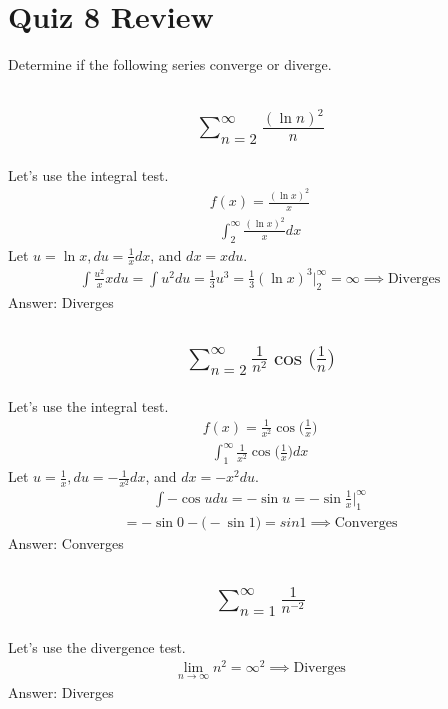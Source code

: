 \documentclass{article}
\begin{document}
\newpage
\section{Quiz 8 Review}
Determine if the following series converge or diverge.
\subsection{
	\begin{align*}
		\sum_{n = 2}^{\infty} \frac{(\ln{n})^2}{n}
	\end{align*}
}
Let's use the integral test.
\begin{align*}
	f(x) = \frac{(\ln{x})^2}{x}
\end{align*}
\begin{align*}
	\int_2^{\infty} {\frac{(\ln{x})^2}{x}} dx
\end{align*}
Let $u = \ln{x}, du = \frac{1}{x}dx$, and $dx = xdu$.
\begin{align*}
	\int {\frac{u^2}{x}x}du = \int{u^2}du = \frac{1}{3}u^3 = \frac{1}{3} (\ln{x})^3 \bigg|_2^{\infty} = \infty \implies \text{Diverges}
\end{align*}
Answer: Diverges

\subsection{
	\begin{align*}
		\sum_{n = 2}^{\infty} \frac{1}{n^2} \cos{\bigg( \frac{1}{n} \bigg)}
	\end{align*}
}
Let's use the integral test.
\begin{align*}
	f(x) = \frac{1}{x^2} \cos{\bigg( \frac{1}{x} \bigg)}
\end{align*}
\begin{align*}
	\int_1^{\infty} {\frac{1}{x^2} \cos{\bigg( \frac{1}{x} \bigg)}}dx
\end{align*}
Let $u = \frac{1}{x}, du = -\frac{1}{x^2}dx$, and $dx = -x^2 du$.
\begin{align*}
	\int {-\cos{u}}du = -\sin{u} = -\sin{\frac{1}{x}} \bigg|_1^{\infty}
\end{align*}
\begin{align*}
	= -\sin{0} - \bigg( -\sin{1} \bigg) = sin{1} \implies \text{Converges}
\end{align*}
Answer: Converges

\subsection{
	\begin{align*}
		\sum_{n = 1}^{\infty} \frac{1}{n^{-2}}
	\end{align*}
}
Let's use the divergence test.
\begin{align*}
	\lim_{n \to \infty} n^2 = \infty^2 \implies \text{Diverges}
\end{align*}
Answer: Diverges
\end{document}
